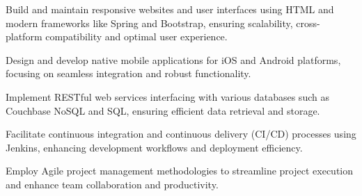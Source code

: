 \begin{tightemize}
    \item Build and maintain responsive websites and user interfaces using HTML and modern frameworks like Spring and Bootstrap, ensuring scalability, cross-platform compatibility and optimal user experience.
    \item Design and develop native mobile applications for iOS and Android platforms, focusing on seamless integration and robust functionality.
    \item Implement RESTful web services interfacing with various databases such as Couchbase NoSQL and SQL, ensuring efficient data retrieval and storage.
    \item Facilitate continuous integration and continuous delivery (CI/CD) processes using Jenkins, enhancing development workflows and deployment efficiency.
    \item Employ Agile project management methodologies to streamline project execution and enhance team collaboration and productivity.
\end{tightemize}
